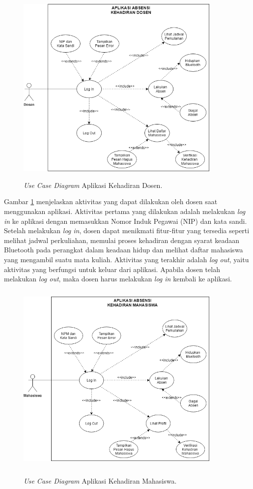 \begin{enumerate}[a.]
\begin{figure}[H]
	\center
	\shadowbox
	{\includegraphics [width=10cm, height=9cm]{gambar/model/use-case-dosen}}
	\caption{\textit{Use Case Diagram} Aplikasi Kehadiran Dosen.}
	\label{usecasedosen}
\end{figure}

\par Gambar \ref{usecasedosen} menjelaskan aktivitas yang dapat dilakukan oleh dosen saat menggunakan aplikasi. Aktivitas pertama yang dilakukan adalah melakukan \textit{log in} ke aplikasi dengan memasukkan Nomor Induk Pegawai (NIP) dan kata sandi. Setelah melakukan \textit{log in}, dosen dapat menikmati fitur-fitur yang tersedia seperti melihat jadwal perkuliahan, memulai proses kehadiran dengan syarat keadaan Bluetooth pada perangkat dalam keadaan hidup dan melihat daftar mahasiswa yang mengambil suatu mata kuliah. Aktivitas yang terakhir adalah \textit{log out}, yaitu aktivitas yang berfungsi untuk keluar dari aplikasi. Apabila dosen telah melakukan \textit{log out}, maka dosen harus melakukan \textit{log in} kembali ke aplikasi.

\begin{figure}[H]
	\center
	\shadowbox
	{\includegraphics [width=10cm, height=9.5cm]{gambar/model/use-case-mahasiswa}}
	\caption{\textit{Use Case Diagram} Aplikasi Kehadiran Mahasiswa.}
	\label{usecasemahasiswa}
\end{figure}


\end{enumerate}
